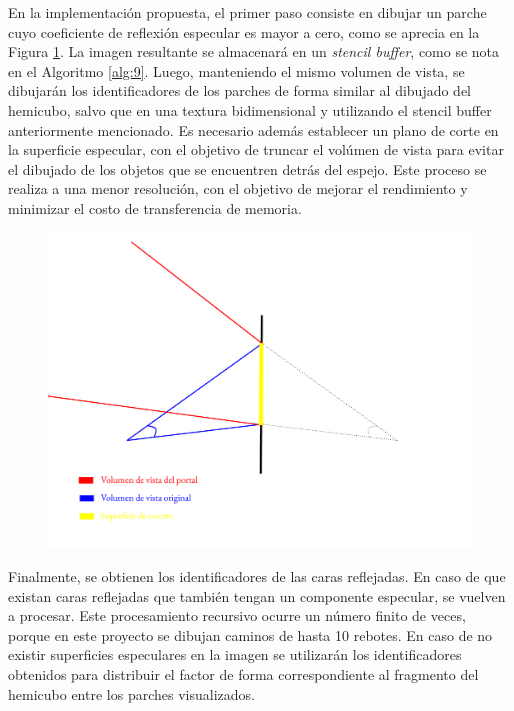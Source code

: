 En la implementación propuesta, el primer paso consiste en dibujar un parche cuyo coeficiente de reflexión especular es mayor a cero, como se aprecia en la Figura \ref{img:espejo}. La imagen resultante se almacenará en un \textit{stencil buffer}, como se nota en el Algoritmo \ref{alg:9}. Luego, manteniendo el mismo volumen de vista, se dibujarán los identificadores de los parches de forma similar al dibujado del hemicubo, salvo que en una textura bidimensional y utilizando el stencil buffer anteriormente mencionado. Es necesario además establecer un plano de corte en la superficie especular, con el objetivo de truncar el volúmen de vista para evitar el dibujado de los objetos que se encuentren detrás del espejo. Este proceso se realiza a una menor resolución, con el objetivo de mejorar el rendimiento y minimizar el costo de transferencia de memoria.

\begin{figure}[htbp!]
	\centering
	\includegraphics[width=.9\linewidth]{assets/Espejo}
	\label{img:espejo}
\end{figure}

Finalmente, se obtienen los identificadores de las caras reflejadas. En caso de que existan caras reflejadas que también tengan un componente especular, se vuelven a procesar. Este procesamiento recursivo ocurre un número finito de veces, porque en este proyecto se dibujan caminos de hasta 10 rebotes. En caso de no existir superficies especulares en la imagen se utilizarán los identificadores obtenidos para distribuir el factor de forma correspondiente al fragmento del hemicubo entre los parches visualizados.

